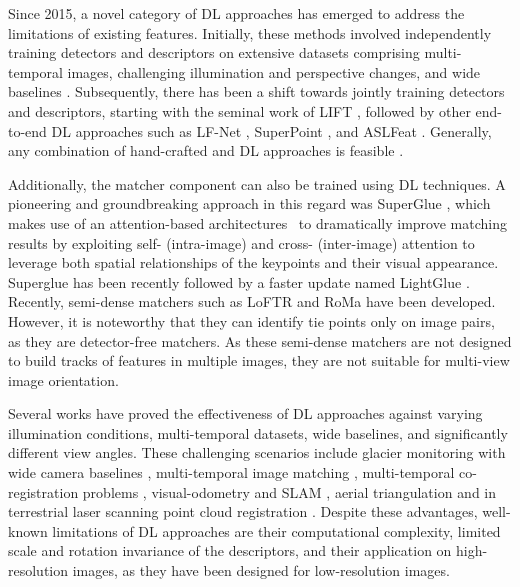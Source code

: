 Since 2015, a novel category of DL approaches has emerged to address the limitations of existing features.
Initially, these methods involved independently training detectors and descriptors on extensive datasets comprising multi-temporal images, challenging illumination and perspective changes, and wide baselines \citep{mishchuk2018working}. %
Subsequently, there has been a shift towards jointly training detectors and descriptors, starting with the seminal work of LIFT \citep{yi2016lift}, followed by other end-to-end DL approaches such as LF-Net \citep{ono2018lfnet}, SuperPoint \citep{DeTone_2018}, and ASLFeat \citep{luo2020aslfeat}.
Generally, any combination of hand-crafted and DL approaches is feasible \citep{jin_image_2021}.

Additionally, the matcher component can also be trained using DL techniques.
A pioneering and groundbreaking approach in this regard was SuperGlue \citep{sarlin2020superglue}, which makes use of an attention-based architectures~\citep{vaswani2023attention} to dramatically improve matching results by exploiting self- (intra-image) and cross- (inter-image) attention to leverage both spatial relationships of the keypoints and their visual appearance.
Superglue has been recently followed by a faster update named LightGlue \citep{lindenberger2023lightglue}. 
Recently, semi-dense matchers such as LoFTR \citep{sun2021_loftr} and RoMa \citep{edstedt2023roma} have been developed. 
However, it is noteworthy that they can identify tie points only on image pairs, as they are detector-free matchers. 
As these semi-dense matchers are not designed to build tracks of features in multiple images, they are not suitable for multi-view image orientation.

Several works have proved the effectiveness of DL approaches against varying illumination conditions, multi-temporal datasets, wide baselines, and significantly different view angles.
These challenging scenarios include glacier monitoring with wide camera baselines \citep{ioli2023_replicable, ioli2024deep}, 
multi-temporal image matching \citep{Maiwald2023_HAI-SFM}, 
multi-temporal co-registration problems \citep{Maiwald2021_Historical, Morelli2022_photogrnowandthen}, 
visual-odometry and SLAM \citep{morelli2023colmap}, 
aerial triangulation \citep{remondino2022_at_with_dl} 
and in terrestrial laser scanning point cloud registration \citep{Markiewicz2023}.
Despite these advantages, well-known limitations of DL approaches are their computational complexity, 
limited scale and rotation invariance of the descriptors, and their application on high-resolution images, 
as they have been designed for low-resolution images.

